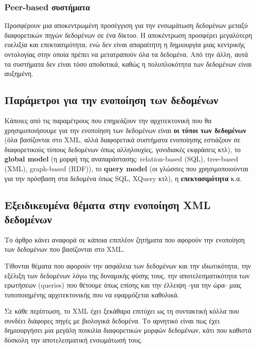         \subsubsection{Peer-based συστήματα}
            Προσφέρουν μια αποκεντρωμένη προσέγγιση για την ενσωμάτωση δεδομένων μεταξύ διαφορετικών πηγών δεδομένων σε ένα δίκτυο.
            Η αποκέντρωση προσφέρει μεγαλύτερη ευελιξία και επεκτασιμότητα, ενώ δεν είναι απαραίτητη η δημιουργία μιας κεντρικής οντολογίας στην οποία πρέπει να μετατραπούν όλα τα δεδομένα.
            Από την άλλη, αυτά τα συστήματα δεν είναι τόσο αποδοτικά, καθώς η πολυπλοκότητα των δεδομένων είναι αυξημένη.


    \subsection{Παράμετροι για την ενοποίηση των δεδομένων}
        Κάποιες από τις παραμέτρους που επηρεάζουν την αρχιτεκτονική που θα χρησιμοποιήσουμε για την ενοποίηση των δεδομένων είναι \textbf{οι τύποι των δεδομένων} (όλα βασίζονται στο XML, αλλά διαφορετικά συστήματα ενοποίησης εστιάζουν σε διαφορετικούς τύπους δεδομένων όπως αλληλουχίες, γονιδιακές εκφράσεις κτλ),
            το \textbf{global model} (η μορφή της αναπαράστασης: relation-based (SQL), tree-based (XML), graph-based (RDF)), το \textbf{query model} (οι γλώσσες που χρησιμοποιούνται για την πρόσβαση στα δεδομένα όπως SQL, XQuery κτλ), η \textbf{επεκτασιμότητα} κ.α.

    \subsection{Εξειδικευμένα θέματα στην ενοποίηση XML δεδομένων}
        Το άρθρο κάνει αναφορά σε κάποια επιπλέον ζητήματα που αφορούν την ενοποίηση των δεδομένων που βασίζονται στο XML.

        Τίθονται θέματα που αφορούν την ασφάλεια των δεδομένων και την ιδιωτικότητα, την εξέλιξη των δεδομένων λόγω της δυναμικής φύσης τους, την αποτελεσματικότητα των ερωτήσεων (queries) που θέτουμε όπως επίσης και την έλλειψη -για την ώρα- μιας τυποποιημένης αρχιτεκτονικής που να εφαρμόζεται καθολικά.

    Σε κάθε περίπτωση, το XML έχει ξεκάθαρα επιτύχει ως τη συντακτική κόλλα που συνδέει διάφορες πηγές με βιολογικά δεδομένα.
    Το αρνητικό είναι πως έχει δημιουργήσει μια μεγάλη ποικιλία διαφορετικών μορφών δεδομένων, κάτι που καθιστά δύσκολη την αποτελεσματική ενσωμάτωσή τους.